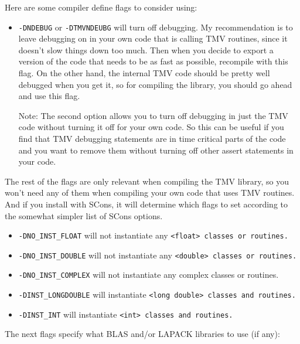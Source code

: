 Here are some compiler define flags to consider using:
\begin{itemize}
\item
\texttt{-DNDEBUG} or \texttt{-DTMVNDEUBG}
will turn off debugging.  My recommendation is to leave debugging
on in your own code that is calling TMV routines, since it doesn't slow things down too 
much.  Then when you decide to export a version of the code that needs to be as fast 
as possible, recompile with this flag.
On the other hand, the internal TMV code should be pretty well debugged
when you get it, so for compiling the library, you should go ahead and use this flag.

Note: The second option allows you to turn off debugging in just the TMV code
without turning it off for your own code.  So this can be useful if you 
find that TMV debugging statements are in time critical parts of the code
and you want to remove them without turning off other assert statements 
in your code.
\end{itemize}
The rest of the flags are only relevant when compiling the TMV library, so you won't 
need any of them when compiling your own code that uses TMV routines.  And if you 
install with SCons, it will determine which flags to set according to the somewhat simpler 
list of SCons options.
\begin{itemize}
\item
\texttt{-DNO\_INST\_FLOAT} will not instantiate any \tt{<float>} classes or routines.
\item
\texttt{-DNO\_INST\_DOUBLE} will not instantiate any \tt{<double>} classes or routines.
\item
\texttt{-DNO\_INST\_COMPLEX} will not instantiate any complex classes or routines.
\item
\texttt{-DINST\_LONGDOUBLE} will instantiate \tt{<long double>} classes and routines.
\item
\texttt{-DINST\_INT} will instantiate \tt{<int>} classes and routines.
\end{itemize}
The next flags specify what BLAS and/or LAPACK libraries to use (if any):
